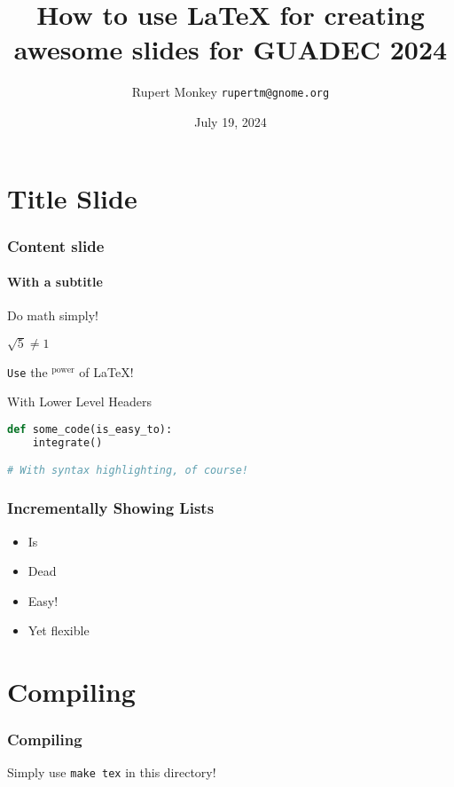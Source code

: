 \documentclass[aspectratio=43]{beamer}
\title[How to use \LaTeX{} for GUADEC 2024]{How to use \LaTeX{} for creating awesome slides for GUADEC 2024}
\author{Rupert Monkey \texttt{rupertm@gnome.org}}
\date{July 19, 2024}
\begin{document}
\begin{frame}
\titlepage
\end{frame}

\section{Title Slide}

\begin{frame}[containsverbatim]
\frametitle{Content slide}
\framesubtitle{With a subtitle}

    Do math simply!

    \begin{center}
        $\sqrt{5} \neq 1$
    \end{center}

    \texttt{Use} the $^\text{power}$ of \LaTeX!

    \begin{block}{With Lower Level Headers}
        \begin{lstlisting}[language=Python]
def some_code(is_easy_to):
    integrate()

# With syntax highlighting, of course!
        \end{lstlisting}
    \end{block}
\end{frame}

\begin{frame}
\frametitle{Incrementally Showing Lists}

    \begin{itemize}
        \item<1-> Is
        \item<2-| alert@2> Dead
        \item<3-> Easy!
        \item<1-> Yet flexible
    \end{itemize}
\end{frame}

\section{Compiling}

\begin{frame}
\frametitle{Compiling}

    Simply use \texttt{make tex} in this directory!
\end{frame}
\end{document}
